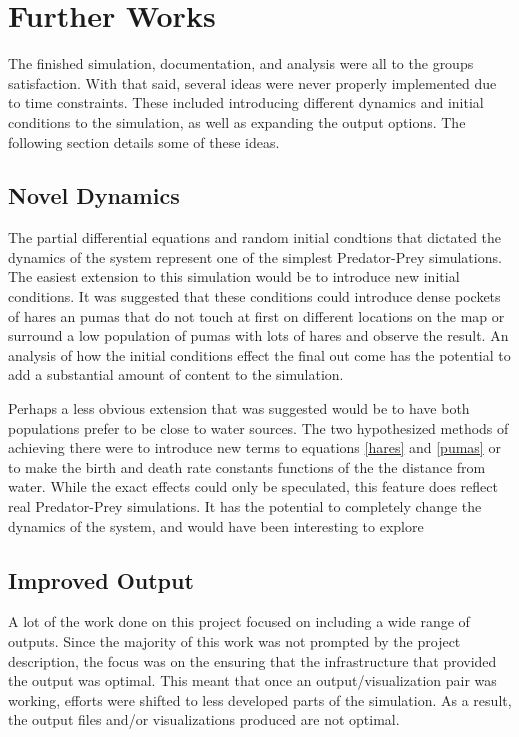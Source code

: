 \documentclass[a4paper,11pt]{article}
\begin{document}
\section{Further Works}

The finished simulation, documentation, and analysis were all to the groups satisfaction.  With that said, several ideas were never properly implemented due to time constraints.  These included introducing different dynamics and initial conditions to the simulation, as well as expanding the output options.  The following section details some of these ideas.

\subsection{Novel Dynamics}

The partial differential equations and random initial condtions that dictated the dynamics of the system represent one of the simplest Predator-Prey simulations.  The easiest extension to this simulation would be to introduce new initial conditions.  It was suggested that these conditions could introduce dense pockets of hares an pumas that do not touch at first on different locations on the map or surround a low population of pumas with lots of hares  and observe the result.  An analysis of how the initial conditions effect the final out come has the potential to add a substantial amount of content to the simulation.  

Perhaps a less obvious extension that was suggested would be to have both populations prefer to be close to water sources.  The two hypothesized methods of achieving there were to introduce new terms to equations \eqref{hares} and \eqref{pumas} or to make the birth and death rate constants functions of the the distance from water.  While the exact effects could only be speculated, this feature does reflect real Predator-Prey simulations.  It has the potential to completely change the dynamics of the system, and would have been interesting to explore

\subsection{Improved Output}

A lot of the work done on this project focused on including a wide range of outputs.  Since the majority of this work was not prompted by the project description, the focus was on the ensuring that the infrastructure that provided the output was optimal.  This meant that once an output/visualization pair was working, efforts were shifted to less developed parts of the simulation.  As a result, the output files and/or visualizations produced are not optimal.  
\end{document}
